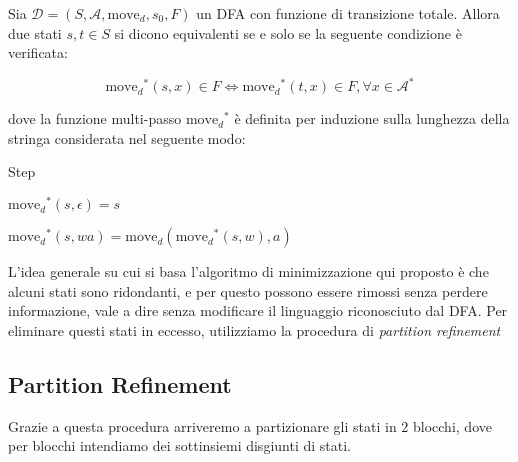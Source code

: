 \documentclass[class=book, crop=false, oneside, 12pt]{standalone}
\begin{document}
\begin{definition}
    Sia \(\mathcal{D} = (S,\mathcal{A},\textrm{move}_{d},s_{0},F)\) un DFA con funzione di transizione totale. Allora due stati \(s,t \in S\) si dicono equivalenti se e solo se la seguente condizione è verificata:

    \begin{equation}
        \textrm{move}_{d}\!^{*}(s,x) \in F \iff \textrm{move}_{d}\!^{*}(t,x) \in F,  \forall x \in \mathcal{A}^{*} 
    \end{equation}
    
    \noindent dove la funzione multi-passo \(\textrm{move}_{d}\!^{*}\) è definita per induzione sulla lunghezza della stringa considerata nel seguente modo:

    \begin{labeling}{Step}
        \item[Base] \(\textrm{move}_{d}\!^{*}(s,\epsilon)=s\) 
        \item[Step] \(\textrm{move}_{d}\!^{*}(s,wa)= \textrm{move}_{d}(\textrm{move}_{d}\!^{*}(s,w),a)\)
    \end{labeling}    
\end{definition}

L'idea generale su cui si basa l'algoritmo di minimizzazione qui proposto è che alcuni stati sono ridondanti, e per questo possono essere rimossi senza perdere informazione, vale a dire senza modificare il linguaggio riconosciuto dal DFA. Per eliminare questi stati in eccesso, utilizziamo la procedura di \emph{partition refinement}

\subsection{Partition Refinement}
Grazie a questa procedura arriveremo a partizionare gli stati in \(2\) blocchi, dove per blocchi intendiamo dei sottinsiemi disgiunti di stati.
\end{document}
